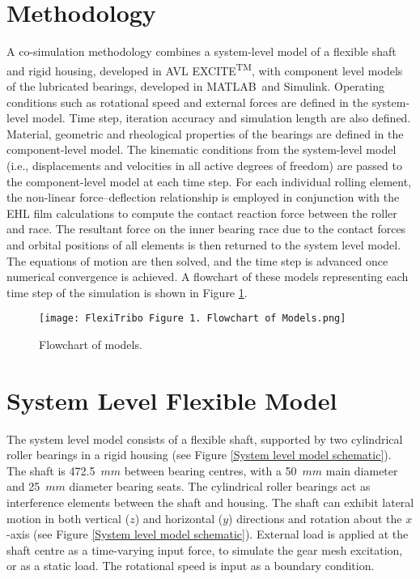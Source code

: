 \section{Methodology}

A co-simulation methodology combines a system-level model of a flexible shaft and rigid housing, developed in AVL EXCITE\textsuperscript{TM}, with component level models of the lubricated bearings, developed in MATLAB\textregistered\ and Simulink{\textregistered}. Operating conditions such as rotational speed and external forces are defined in the system-level model. Time step, iteration accuracy and simulation length are also defined. Material, geometric and rheological properties of the bearings are defined in the component-level model. The kinematic conditions from the system-level model (i.e., displacements and velocities in all active degrees of freedom) are passed to the component-level model at each time step. For each individual rolling element, the non-linear force–deflection relationship is employed in conjunction with the EHL film calculations to compute the contact reaction force between the roller and race. The resultant force on the inner bearing race due to the contact forces and orbital positions of all elements is then returned to the system level model. The equations of motion are then solved, and the time step is advanced once numerical convergence is achieved. A flowchart of these models representing each time step of the simulation is shown in Figure \ref{Flowchart of models}.

\begin{figure}
	\centering
	\texttt{[image: FlexiTribo Figure 1. Flowchart of Models.png]}
	\caption{Flowchart of models.}
	\label{Flowchart of models}
\end{figure} 

\section{System Level Flexible Model} \label{System level flexible model}

The system level model consists of a flexible shaft, supported by two cylindrical roller bearings in a rigid housing (see Figure \ref{System level model schematic}). The shaft is 472.5~$mm$ between bearing centres, with a 50~$mm$ main diameter and 25~$mm$ diameter bearing seats. The cylindrical roller bearings act as interference elements between the shaft and housing. The shaft can exhibit lateral motion in both vertical ($z$) and horizontal ($y$) directions and rotation about the $x$-axis (see Figure \ref{System level model schematic}). External load is applied at the shaft centre as a time-varying input force, to simulate the gear mesh excitation, or as a static load. The rotational speed is input as a boundary condition.

